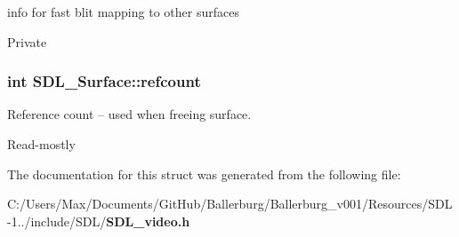 info for fast blit mapping to other surfaces 

Private 
\subsubsection[{refcount}]{\setlength{\rightskip}{0pt plus 5cm}int S\+D\+L\+\_\+\+Surface\+::refcount}\label{struct_s_d_l___surface_a03d10628a359c0674f5ceffd574f1641}


Reference count -- used when freeing surface. 

Read-\/mostly 

The documentation for this struct was generated from the following file\+:\begin{DoxyCompactItemize}
\item 
C\+:/\+Users/\+Max/\+Documents/\+Git\+Hub/\+Ballerburg/\+Ballerburg\+\_\+v001/\+Resources/\+S\+D\+L-\/1../include/\+S\+D\+L/{\bf S\+D\+L\+\_\+video.\+h}\end{DoxyCompactItemize}
